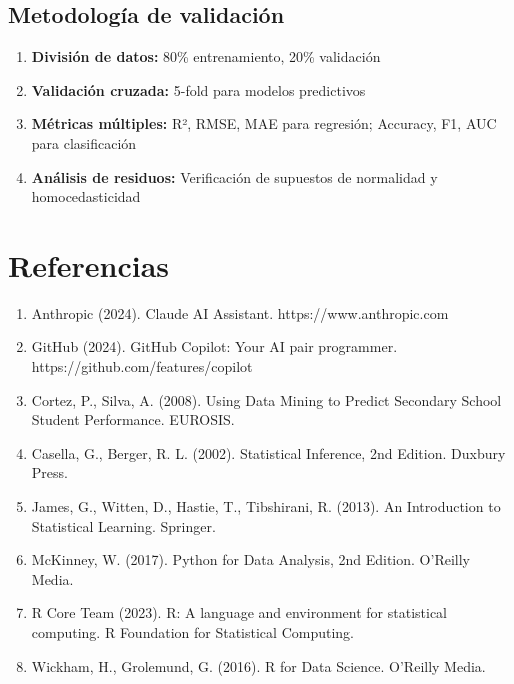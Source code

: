 \documentclass[a4paper,12pt]{article}
\begin{document}
\subsection{Metodología de validación}

\begin{enumerate}
    \item \textbf{División de datos:} 80\% entrenamiento, 20\% validación
    \item \textbf{Validación cruzada:} 5-fold para modelos predictivos
    \item \textbf{Métricas múltiples:} R², RMSE, MAE para regresión; Accuracy, F1, AUC para clasificación
    \item \textbf{Análisis de residuos:} Verificación de supuestos de normalidad y homocedasticidad
\end{enumerate}

\section{Referencias}

\begin{enumerate}
    \item Anthropic (2024). Claude AI Assistant. https://www.anthropic.com
        \item GitHub (2024). GitHub Copilot: Your AI pair programmer. https://github.com/features/copilot
    \item Cortez, P., Silva, A. (2008). Using Data Mining to Predict Secondary School Student Performance. EUROSIS.
    \item Casella, G., Berger, R. L. (2002). Statistical Inference, 2nd Edition. Duxbury Press.
    \item James, G., Witten, D., Hastie, T., Tibshirani, R. (2013). An Introduction to Statistical Learning. Springer.
    \item McKinney, W. (2017). Python for Data Analysis, 2nd Edition. O'Reilly Media.
    \item R Core Team (2023). R: A language and environment for statistical computing. R Foundation for Statistical Computing.
    \item Wickham, H., Grolemund, G. (2016). R for Data Science. O'Reilly Media.
\end{enumerate}
\end{document}
